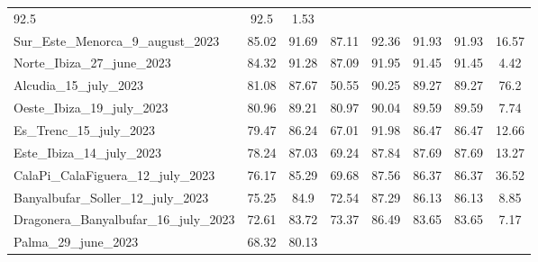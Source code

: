 \begin{table}[H]
{\begin{tabular}{lccccccc}
            92.5                                   & 92.5      & 1.53
            \\
            Sur\_Este\_Menorca\_9\_august\_2023    & 85.02     & 91.69      &
            87.11                                  & 92.36     &
            91.93                                  & 91.93     & 16.57
            \\
            Norte\_Ibiza\_27\_june\_2023           & 84.32     & 91.28      &
            87.09                                  & 91.95     &
            91.45                                  & 91.45     & 4.42
            \\
            Alcudia\_15\_july\_2023                & 81.08     & 87.67      &
            50.55                                  & 90.25     &
            89.27                                  & 89.27     & 76.2
            \\
            Oeste\_Ibiza\_19\_july\_2023           & 80.96     & 89.21      &
            80.97                                  & 90.04     &
            89.59                                  & 89.59     & 7.74
            \\
            Es\_Trenc\_15\_july\_2023              & 79.47     & 86.24      &
            67.01                                  & 91.98     &
            86.47                                  & 86.47     & 12.66
            \\
            Este\_Ibiza\_14\_july\_2023            & 78.24     & 87.03      &
            69.24                                  & 87.84     &
            87.69                                  & 87.69     & 13.27
            \\
            CalaPi\_CalaFiguera\_12\_july\_2023    & 76.17     & 85.29      &
            69.68                                  & 87.56     &
            86.37                                  & 86.37     & 36.52
            \\
            Banyalbufar\_Soller\_12\_july\_2023    & 75.25     & 84.9       &
            72.54                                  & 87.29     &
            86.13                                  & 86.13     & 8.85
            \\
            Dragonera\_Banyalbufar\_16\_july\_2023 & 72.61     & 83.72      &
            73.37                                  & 86.49     &
            83.65                                  & 83.65     & 7.17
            \\
            Palma\_29\_june\_2023                  & 68.32     & 80.13      &

\end{tabular}}
\end{table}
